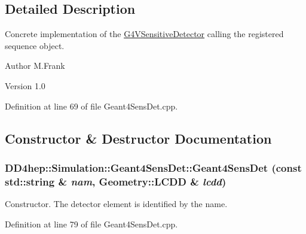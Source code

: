 \subsection{Detailed Description}
Concrete implementation of the \hyperlink{class_g4_v_sensitive_detector}{G4VSensitiveDetector} calling the registered sequence object. \begin{DoxyAuthor}{Author}
M.Frank 
\end{DoxyAuthor}
\begin{DoxyVersion}{Version}
1.0 
\end{DoxyVersion}


Definition at line 69 of file Geant4SensDet.cpp.

\subsection{Constructor \& Destructor Documentation}
\hypertarget{class_d_d4hep_1_1_simulation_1_1_geant4_sens_det_a3e1c226eea8d6027fabf211df59fa4c4}{
\subsubsection[{Geant4SensDet}]{\setlength{\rightskip}{0pt plus 5cm}DD4hep::Simulation::Geant4SensDet::Geant4SensDet (const std::string \& {\em nam}, \/  {\bf Geometry::LCDD} \& {\em lcdd})}}
\label{class_d_d4hep_1_1_simulation_1_1_geant4_sens_det_a3e1c226eea8d6027fabf211df59fa4c4}


Constructor. The detector element is identified by the name. 

Definition at line 79 of file Geant4SensDet.cpp.

